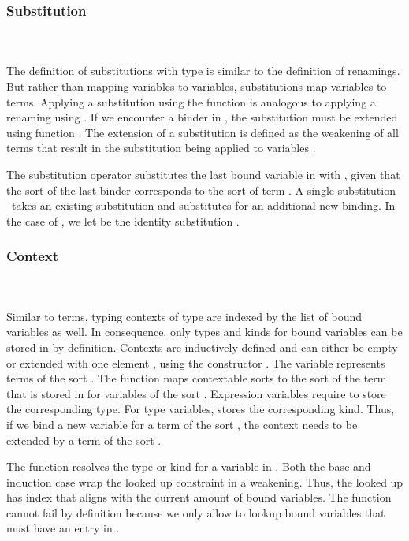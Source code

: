 \subsubsection{Substitution}\hfill\\\\
The definition of substitutions  with type    is similar to the definition of renamings. But rather than mapping variables to variables, substitutions map variables to terms.
\FSub
Applying a substitution using the  function is analogous to applying a renaming using . If we encounter a binder in , the substitution must be extended using function .
\Fext
The extension of a substitution is defined as the weakening of all terms that result in the substitution being applied to variables .

\noindent The substitution operator  \Data{[}  \Data{]} substitutes the last bound variable in  with , given that the sort of the last binder corresponds to the sort of term .
\Fsubs
A single substitution \Fsinglesub\ takes an existing substitution  and substitutes  for an additional new binding. In the case of \Data{\_[\_]}, we let  be the identity substitution \Fidsub.

\subsubsection{Context}\hfill\\\\
Similar to terms, typing contexts  of type   are indexed by the list of bound variables as well. In consequence, only types and kinds for bound variables can be stored in  by definition.
\FCtx
Contexts are inductively defined and can either be empty  or extended with one element , using the constructor   . The variable  represents terms of the sort  . 
\noindent The function  maps contextable sorts  to the sort of the term that is stored in  for variables of the sort .
\Fkind
Expression variables require  to store the corresponding type. 
For type variables,  stores the corresponding kind. Thus, if we bind a new variable for a term of the sort , the context  needs to be extended by a term of the sort  .

\noindent The  function resolves the type or kind for a variable  in .
\Flookup
Both the base and induction case wrap the looked up constraint in a weakening. Thus, the looked up  has index  that aligns with the current amount of bound variables. The  function cannot fail by definition because we only allow to lookup bound variables that must have an entry in .

